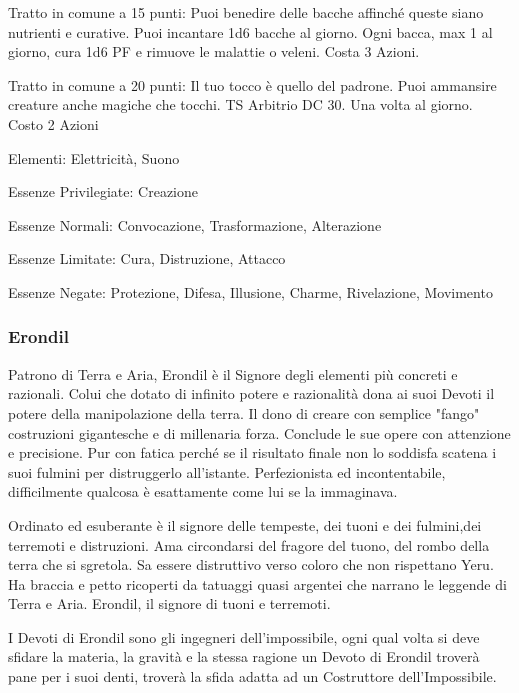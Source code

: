 \documentclass[a4paper,11pt,twoside,openany]{book}
\begin{document}
Tratto in comune a 15 punti: Puoi benedire delle bacche affinché queste siano nutrienti e curative. Puoi incantare 1d6 bacche al giorno. Ogni bacca, max 1 al giorno, cura 1d6 PF e rimuove le malattie o veleni. Costa 3 Azioni.

Tratto in comune a 20 punti: Il tuo tocco è quello del padrone. Puoi ammansire creature anche magiche che tocchi. TS Arbitrio DC 30. Una volta al giorno. Costo 2 Azioni

\bigskip

Elementi: Elettricità, Suono

\bigskip

Essenze Privilegiate: Creazione

Essenze Normali: Convocazione, Trasformazione, Alterazione

Essenze Limitate: Cura, Distruzione, Attacco

Essenze Negate: Protezione, Difesa, Illusione, Charme, Rivelazione, Movimento

\subsubsection{Erondil}

\label{erondil}

Patrono di Terra e Aria, Erondil è il Signore degli elementi più concreti e razionali. Colui che dotato di infinito potere e razionalità dona ai suoi Devoti il potere della manipolazione della terra. Il dono di creare con semplice "fango" costruzioni gigantesche e di millenaria forza. Conclude le sue opere con attenzione e precisione.
Pur con fatica perché se il risultato finale non lo soddisfa scatena i suoi fulmini per distruggerlo all'istante. Perfezionista ed incontentabile, difficilmente qualcosa è esattamente come lui se la immaginava.

Ordinato ed esuberante è il signore delle tempeste, dei tuoni e dei fulmini,dei terremoti e distruzioni. Ama circondarsi del fragore del tuono, del rombo della terra che si sgretola. Sa essere distruttivo verso coloro che non rispettano Yeru.
Ha braccia e petto ricoperti da tatuaggi quasi argentei che narrano le leggende di Terra e Aria. Erondil, il signore di tuoni e terremoti.


I Devoti di Erondil sono gli ingegneri dell'impossibile, ogni qual volta si deve sfidare la materia, la gravità e la stessa ragione un Devoto di Erondil troverà pane per i suoi denti, troverà la sfida adatta ad un Costruttore dell'Impossibile.
\end{document}
